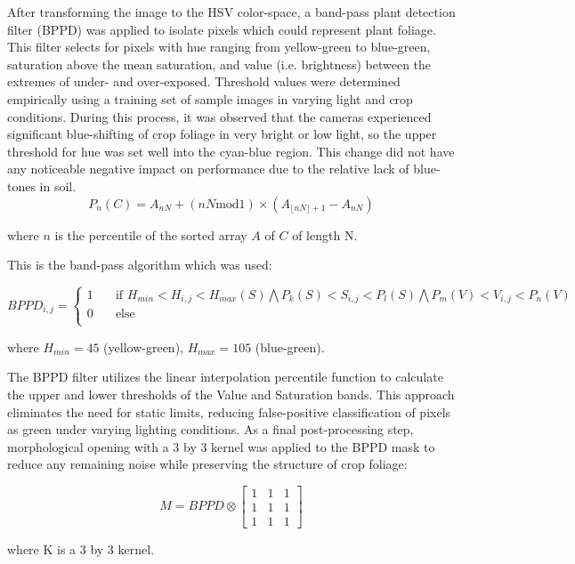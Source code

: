 \documentclass[authoryear]{elsarticle}
\begin{document}
After transforming the image to the HSV color-space, a band-pass plant
detection filter (BPPD) was applied to isolate pixels which could
represent plant foliage. This filter selects for pixels with hue
ranging from yellow-green to blue-green, saturation above the mean
saturation, and value (i.e. brightness) between the extremes of under-
and over-exposed. Threshold values were determined empirically using a
training set of sample images in varying light and crop
conditions. During this process, it was observed that the cameras
experienced significant blue-shifting of crop foliage in very bright
or low light, so the upper threshold for hue was set well into the
cyan-blue region. This change did not have any noticeable negative
impact on performance due to the relative lack of blue-tones in soil.
\begin{equation}
  P_{n}(C) = A_{nN} + (nN \text{mod} 1) \times (A_{\lfloor nN \rfloor + 1}-A_{nN})
  \label{eq:percentile}
\end{equation}
\begin{flushleft}
where $n$ is the percentile of the  sorted array $A$ of $C$ of length N.
\end{flushleft}

This is the band-pass algorithm which was used:

\begin{equation}
BPPD_{i,j} =
  \begin{cases}
    1  & \quad \text{if } H_{min}<H_{i,j}<H_{max}(S) \bigwedge P_{k}(S)< S_{i,j} <P_{l}(S) \bigwedge P_{m}(V)< V_{i,j}<P_{n}(V)\text{ }\\
    0  & \quad \text{else}\\
  \end{cases}
  \label{eq:bppd}
\end{equation}
\begin{flushleft}
where $H_{min}=45$ (yellow-green), $H_{max}=105$ (blue-green).
\end{flushleft}

The BPPD filter utilizes the linear interpolation percentile function
to calculate the upper and lower thresholds of the Value and
Saturation bands. This approach eliminates the need for static limits,
reducing false-positive classification of pixels as green under
varying lighting conditions. As a final post-processing step,
morphological opening with a 3 by 3 kernel was applied to the BPPD
mask to reduce any remaining noise while preserving the structure of
crop foliage:

\begin{equation}
M = BPPD \otimes
\begin{bmatrix}
       1 & 1 & 1 \\
       1 & 1 & 1 \\
       1 & 1 & 1
     \end{bmatrix}
\label{eq:morph_opening}
\end{equation}
\begin{flushleft}
where K is a 3 by 3 kernel.
\end{flushleft}
\end{document}
